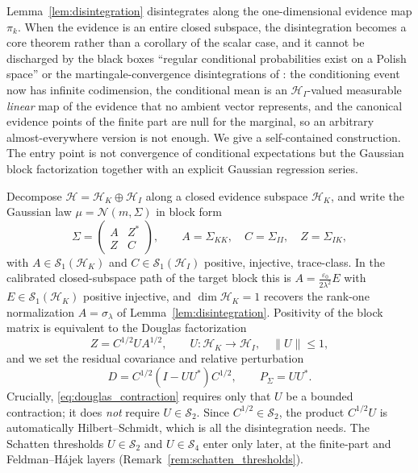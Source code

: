Lemma~\ref{lem:disintegration} disintegrates along the one-dimensional evidence
map $\pi_k$.  When the evidence is an entire closed subspace, the disintegration
becomes a core theorem rather than a corollary of the scalar case, and it cannot
be discharged by the black boxes ``regular conditional probabilities exist on a
Polish space'' or the martingale-convergence disintegrations of
\cite{lagatta2013continuous,steinwart2024conditioning}: the conditioning event
now has infinite codimension, the conditional mean is an $\mathcal{H}_I$-valued
measurable \emph{linear} map of the evidence that no ambient vector represents,
and the canonical evidence points of the finite part are null for the marginal,
so an arbitrary almost-everywhere version is not enough.  We give a
self-contained construction.  The entry point is not convergence of conditional
expectations but the Gaussian block factorization together with an explicit
Gaussian regression series.

Decompose $\mathcal{H}=\mathcal{H}_K\oplus\mathcal{H}_I$ along a closed evidence
subspace $\mathcal{H}_K$, and write the Gaussian law $\mu=\mathcal{N}(m,\Sigma)$
in block form
\[
  \Sigma=
  \begin{pmatrix} A & Z^* \\ Z & C \end{pmatrix},
  \qquad
  A=\Sigma_{KK},\quad C=\Sigma_{II},\quad Z=\Sigma_{IK},
\]
with $A\in\mathcal{S}_1(\mathcal{H}_K)$ and $C\in\mathcal{S}_1(\mathcal{H}_I)$
positive, injective, trace-class.  In the calibrated closed-subspace path of the
target block this is $A=\tfrac{\varepsilon_0}{2\lambda^2}E$ with
$E\in\mathcal{S}_1(\mathcal{H}_K)$ positive injective, and $\dim\mathcal{H}_K=1$
recovers the rank-one normalization $A=\sigma_\lambda$ of
Lemma~\ref{lem:disintegration}.  Positivity of the block matrix is equivalent to
the Douglas factorization
\begin{equation}
  Z=C^{1/2}UA^{1/2},
  \qquad
  U:\mathcal{H}_K\to\mathcal{H}_I,\quad \|U\|\le1,
  \label{eq:douglas_contraction}
\end{equation}
and we set the residual covariance and relative perturbation
\begin{equation}
  D=C^{1/2}(I-UU^*)C^{1/2},
  \qquad
  P_\Sigma=UU^*.
  \label{eq:residual_covariance_operator}
\end{equation}
Crucially, \eqref{eq:douglas_contraction} requires only that $U$ be a bounded
contraction; it does \emph{not} require $U\in\mathcal{S}_2$.  Since
$C^{1/2}\in\mathcal{S}_2$, the product $C^{1/2}U$ is automatically
Hilbert--Schmidt, which is all the disintegration needs.  The Schatten
thresholds $U\in\mathcal{S}_2$ and $U\in\mathcal{S}_4$ enter only later, at the
finite-part and Feldman--H\'ajek layers (Remark~\ref{rem:schatten_thresholds}).

